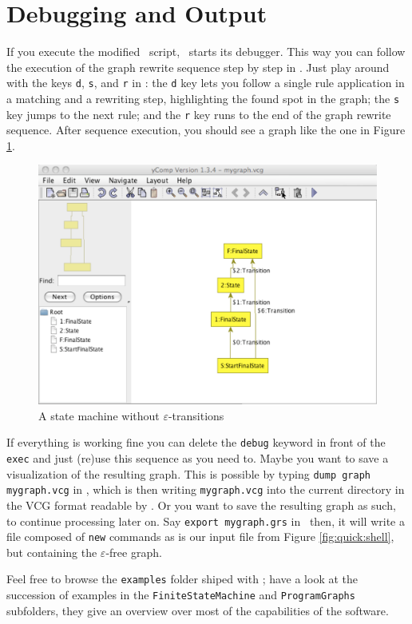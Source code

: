 \section{Debugging and Output}

If you execute the modified \GrShell\ script, \GrG\ starts its debugger.
This way you can follow the execution of the graph rewrite sequence step by step in \yComp.
Just play around with the keys \texttt{d}, \texttt{s}, and \texttt{r} in \GrShell: the \texttt{d} key lets you follow a single rule application in a matching and a rewriting step, highlighting the found spot in the graph; the \texttt{s} key jumps to the next rule; and the \texttt{r} key runs to the end of the graph rewrite sequence.
After sequence execution, you should see a graph like the one in Figure \ref{fig:quick:final}.

\begin{figure}[htbp]
	\centering
	\includegraphics[width=0.99\linewidth]{fig/quickfinal}
	\caption{A state machine without $\varepsilon$-transitions}
	\label{fig:quick:final}
\end{figure}

If everything is working fine you can delete the \texttt{debug} keyword in front of the \texttt{exec} and just (re)use this sequence as you need to.
Maybe you want to save a visualization of the resulting graph.
This is possible by typing \texttt{dump graph mygraph.vcg} in \GrShell,
which is then writing \texttt{mygraph.vcg} into the current directory in the VCG format readable by \yComp.
Or you want to save the resulting graph as such, to continue processing later on.
Say \texttt{export mygraph.grs} in \GrShell\ then, it will write a file composed of \texttt{new} commands as is our input file from Figure \ref{fig:quick:shell}, but containing the $\varepsilon$-free graph.

Feel free to browse the \texttt{examples} folder shiped with \GrG;
have a look at the succession of examples in the \texttt{FiniteStateMachine} and \texttt{ProgramGraphs} subfolders,
they give an overview over most of the capabilities of the software.

